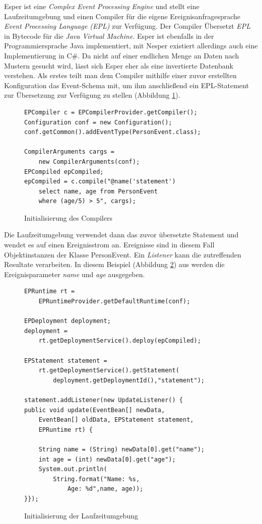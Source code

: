 \documentclass{acm_proc_article-sp}
\begin{document}
Esper ist eine \textit{Complex Event Processing Engine} und stellt eine Laufzeitumgebung 
und einen Compiler für die eigene Ereignisanfragesprache \textit{Event Processing 
Language (EPL)} zur Verfügung. Der Compiler Übersetzt \textit{EPL} in Bytecode für die 
\textit{Java Virtual Machine}. Esper ist ebenfalls in der Programmiersprache Java 
implementiert, mit Nesper existiert allerdings auch eine Implementierung in C\#. Da nicht 
auf einer endlichen Menge an Daten nach Mustern gesucht wird, lässt sich Esper eher als 
eine invertierte Datenbank verstehen. Als erstes teilt man dem Compiler mithilfe einer 
zuvor erstellten Konfiguration das Event-Schema mit, um ihm anschließend ein 
EPL-Statement zur Übersetzung zur Verfügung zu stellen (Abbildung \ref{java:01}). 

\begin{figure}[h]    
\begin{verbatim}
EPCompiler c = EPCompilerProvider.getCompiler();
Configuration conf = new Configuration();
conf.getCommon().addEventType(PersonEvent.class);

CompilerArguments cargs = 
    new CompilerArguments(conf);
EPCompiled epCompiled;
epCompiled = c.compile("@name('statement')
    select name, age from PersonEvent
    where (age/5) > 5", cargs);
\end{verbatim}
\caption{Initialisierung des Compilers}
\label{java:01}
\end{figure}

Die Laufzeitumgebung verwendet dann das zuvor übersetzte Statement und wendet es auf 
einen Ereignisstrom an. Ereignisse sind in diesem Fall Objektinstanzen der Klasse 
PersonEvent. Ein \textit{Listener} kann die zutreffenden Resultate verarbeiten. In 
diesem Beispiel (Abbildung \ref{java:02}) aus \cite{esper-reference} werden die 
Ereignisparameter \textit{name} und \textit{age} ausgegeben.

\begin{figure}[h]    
\begin{verbatim}
EPRuntime rt =
    EPRuntimeProvider.getDefaultRuntime(conf);
    
EPDeployment deployment;
deployment =
    rt.getDeploymentService().deploy(epCompiled);
    
EPStatement statement =         
    rt.getDeploymentService().getStatement(
        deployment.getDeploymentId(),"statement");
        
statement.addListener(new UpdateListener() {
public void update(EventBean[] newData,
    EventBean[] oldData, EPStatement statement,
    EPRuntime rt) {
    
    String name = (String) newData[0].get("name");
    int age = (int) newData[0].get("age");
    System.out.println(
        String.format("Name: %s,
            Age: %d",name, age));
}});
\end{verbatim}
    \caption{Initialisierung der Laufzeitumgebung}
    \label{java:02}
\end{figure}
\end{document}
